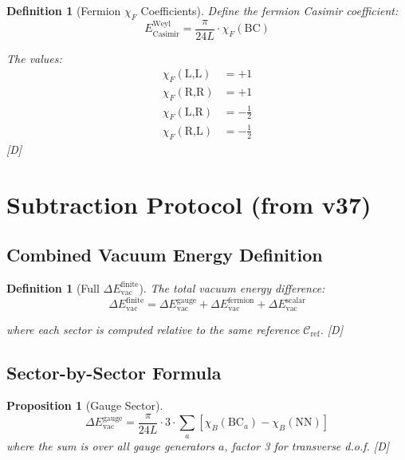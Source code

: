 \documentclass[11pt,a4paper]{article}
\newtheorem{proposition}[theorem]{Proposition}
\newtheorem{definition}[theorem]{Definition}
\newcommand{\tagD}{\textcolor{blue!70!black}{[D]}}
\begin{document}
\begin{definition}[Fermion $\chi_F$ Coefficients]
\label{def:chi-F}
Define the fermion Casimir coefficient:
\begin{equation}
\label{eq:chi-F-def}
E_{\text{Casimir}}^{\text{Weyl}} = \frac{\pi}{24L} \cdot \chi_F(\text{BC})
\end{equation}

The values:
\begin{align}
\label{eq:chi-F-LL}
\chi_F(\text{L,L}) &= +1 \\
\label{eq:chi-F-RR}
\chi_F(\text{R,R}) &= +1 \\
\label{eq:chi-F-LR}
\chi_F(\text{L,R}) &= -\frac{1}{2} \\
\label{eq:chi-F-RL}
\chi_F(\text{R,L}) &= -\frac{1}{2}
\end{align}
\tagD
\end{definition}

\section{Subtraction Protocol (from v37)}
\label{sec:protocol}

\subsection{Combined Vacuum Energy Definition}

\begin{definition}[Full $\Delta E_{\text{vac}}^{\text{finite}}$]
\label{def:full-delta}
The total vacuum energy difference:
\begin{equation}
\label{eq:full-delta}
\boxed{\Delta E_{\text{vac}}^{\text{finite}} = \Delta E_{\text{vac}}^{\text{gauge}}
+ \Delta E_{\text{vac}}^{\text{fermion}} + \Delta E_{\text{vac}}^{\text{scalar}}}
\end{equation}

where each sector is computed relative to the same reference $\mathcal{C}_{\text{ref}}$. \tagD
\end{definition}

\subsection{Sector-by-Sector Formula}

\begin{proposition}[Gauge Sector]
\label{prop:gauge-sector}
\begin{equation}
\label{eq:gauge-formula}
\Delta E_{\text{vac}}^{\text{gauge}} = \frac{\pi}{24L} \cdot 3 \cdot \sum_a [\chi_B(\text{BC}_a) - \chi_B(\text{NN})]
\end{equation}
where the sum is over all gauge generators $a$, factor 3 for transverse d.o.f. \tagD
\end{proposition}
\end{document}

